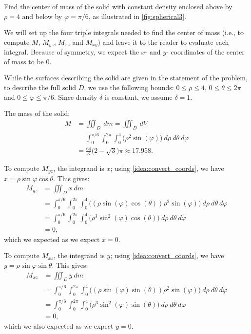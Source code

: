 {Find the center of mass of the solid with constant density enclosed above by $\rho=4$ and below by $\varphi = \pi/6$, as illustrated in \autoref{fig:spherical3}.}
{We will set up the four triple integrals needed to find the center of mass (i.e., to compute $M$, $M_{yz}$, $M_{xz}$ and $M_{xy}$) and leave it to the reader to evaluate each integral. Because of symmetry, we expect the $x$- and $y$- coordinates of the center of mass to be 0.
%

While the surfaces describing the solid are given in the statement of the problem, to describe the full solid $D$, we use the following bounds: $0 \leq \rho \leq 4$, $0 \leq \theta \leq 2\pi$ and $0 \leq \varphi \leq \pi/6$. Since density $\delta$ is constant, we assume $\delta =1$.

The mass of the solid:
\begin{align*}
M &= \iiint_D\ dm = \iiint_D\ dV\\
	&= \int_0^{\pi/6}\int_0^{2\pi}\int_0^4\big(\rho^2\sin(\varphi)\big)\ d\rho\ d\theta\ d\varphi\\
	&= \frac{64}3\big(2-\sqrt{3}\big)\pi \approx 17.958.
\end{align*}

To compute $M_{yz}$, the integrand is $x$; using \autoref{idea:convert_coords}, we have $x = \rho\sin\varphi\cos\theta$. This gives:
\begin{align*}
M_{yz} &= \iiint_D x\ dm \\
	&= \int_0^{\pi/6}\int_0^{2\pi}\int_0^4 \big((\rho\sin(\varphi)\cos(\theta))\rho^2\sin(\varphi)\big) \ d\rho\ d\theta\ d\varphi\\
	&= \int_0^{\pi/6}\int_0^{2\pi}\int_0^4 \big(\rho^3\sin^2(\varphi)\cos(\theta)\big) \ d\rho\ d\theta\ d\varphi\\
	&=0,
\end{align*}
which we expected as we expect $\overline{x} = 0$.

To compute $M_{xz}$, the integrand is $y$; using \autoref{idea:convert_coords}, we have $y = \rho\sin\varphi\sin\theta$. This gives:
\begin{align*}
M_{xz} &= \iiint_D y\ dm \\
	&= \int_0^{\pi/6}\int_0^{2\pi}\int_0^4 \big((\rho\sin(\varphi)\sin(\theta))\rho^2\sin(\varphi)\big) \ d\rho\ d\theta\ d\varphi\\
	&= \int_0^{\pi/6}\int_0^{2\pi}\int_0^4 \big(\rho^3\sin^2(\varphi)\sin(\theta)\big) \ d\rho\ d\theta\ d\varphi\\
	&=0,
\end{align*}
which we also expected as we expect $\overline{y} = 0$.

}
